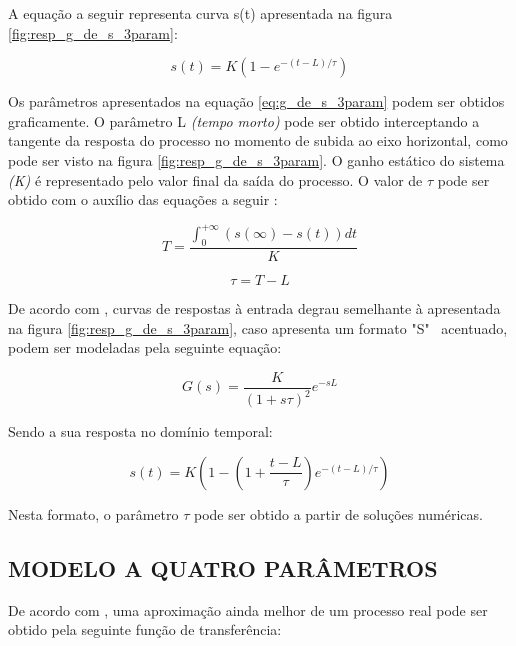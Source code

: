 \documentclass[12pt,oneside,a4paper, chapter=TITLE, section = TITLE, english, brazil]{abntex2}
\begin{document}
A equação a seguir representa curva s(t) apresentada na figura \ref{fig:resp_g_de_s_3param}:

\begin{equation}
s(t) = K(1 - e^{-(t-L)/\tau}) \label{g_de_t_2param}
\end{equation}

Os parâmetros apresentados na equação \ref{eq:g_de_s_3param} podem ser obtidos graficamente. O parâmetro L \textit{(tempo morto)} pode ser obtido interceptando a tangente da resposta do processo no momento de subida ao eixo horizontal, como pode ser visto na figura \ref{fig:resp_g_de_s_3param}. O ganho estático do sistema \textit{(K)} é representado pelo valor final da saída do processo. O valor de $\tau$ pode ser obtido com o auxílio das equações a seguir \cite{astrom}:

\begin{equation}
T = \frac{\int^{+\infty}_0 (s(\infty) - s(t))dt}{K} \label{eq:tau_g_de_s_3param_1}
\end{equation}

\begin{equation}
\tau = T - L \label{eq:tau_g_de_s_3param_2}
\end{equation}

De acordo com , curvas de respostas à entrada degrau semelhante à apresentada na figura \ref{fig:resp_g_de_s_3param}, caso apresenta um formato "S" \ acentuado, podem ser modeladas pela seguinte equação:

\begin{equation}
G(s) = \frac{K}{(1 + s\tau)^2}e^{-sL} \label{eq:g_de_s_3param_2}
\end{equation}

Sendo a sua resposta no domínio temporal:

\begin{equation}
s(t) = K(1- (1 + \frac{t-L}{\tau})e^{-(t-L)/\tau}) \label{eq:g_de_t_3param_2}
\end{equation}

Nesta formato, o parâmetro $\tau$ pode ser obtido a partir de soluções numéricas.

\subsection{MODELO A QUATRO PARÂMETROS} %

De acordo com , uma aproximação ainda melhor de um processo real pode ser obtido pela seguinte função de transferência:
\end{document}
